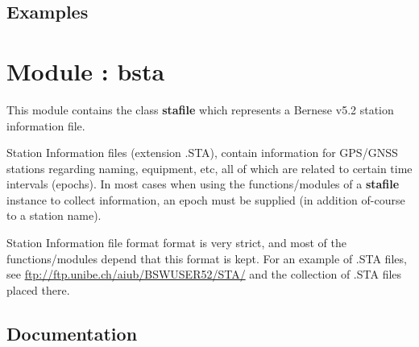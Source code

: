 \documentclass[letterpaper,10pt,english]{sphinxmanual}
\begin{document}
\section{Examples}
\label{bgps:examples}

\chapter{Module : bsta}
\label{bsta:module-bsta}\label{bsta::doc}
This module contains the class \textbf{stafile} which represents a Bernese v5.2
station information file.

Station Information files (extension .STA), contain information for GPS/GNSS
stations regarding naming, equipment, etc, all of which are related to certain
time intervals (epochs). In most cases when using the functions/modules of
a \textbf{stafile} instance to collect information, an epoch must be supplied (in
addition of-course to a station name).

Station Information file format format is very strict, and most of the
functions/modules depend that this format is kept. For an example of .STA
files, see \href{ftp://ftp.unibe.ch/aiub/BSWUSER52/STA/}{ftp://ftp.unibe.ch/aiub/BSWUSER52/STA/} and the collection of .STA
files placed there.


\section{Documentation}
\label{bsta:documentation}
\end{document}
